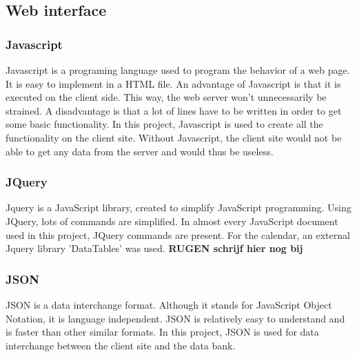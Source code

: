 \subsection{Web interface}
\subsubsection{Javascript}
Javascript is a programing language used to program the behavior of a web page. It is easy to implement in a HTML file. An advantage of Javascript is that it is executed on the client side. This way, the web server won't unnecessarily be strained. A disadvantage is that a lot of lines have to be written in order to get some basic functionality. 
In this project, Javascript is used to create all the functionality on the client site. Without Javascript, the client site would not be able to get any data from the server and would thus be useless. 

\subsubsection{JQuery}
Jquery is a JavaScript library, created to simplify JavaScript programming. Using JQuery, lots of commands are simplified. In almost every JavaScript document used in this project, JQuery commands are present. 
For the calendar, an external Jquery library 'DataTables' was used. 
\textbf{RUGEN schrijf hier nog bij}

\subsubsection{JSON}
JSON is a data interchange format. Although it stands for JavaScript Object Notation, it is language independent. JSON is relatively easy to understand and is faster than other similar formats. In this project, JSON is used for data interchange between the client site and the data bank. 
